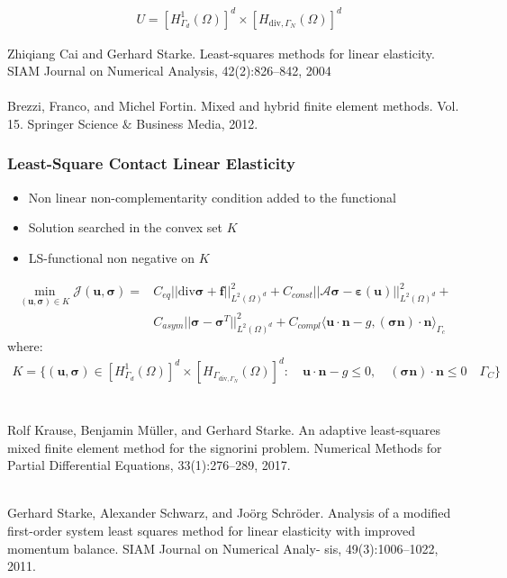 \documentclass[8pt, oneside]{beamer}   	%
\newcommand{\bff}{\textbf{f}}
\newcommand{\bn}{\textbf{n}}
\newcommand{\bu}{\textbf{u}}
\newcommand{\bsigma}{\boldsymbol{\sigma}}
\begin{document}
\begin{frame}
\begin{itemize}
\begin{align*}
& U=\left[H_{\Gamma_{d}}^1(\Omega) \right]^d \times \left[ H_{{\text{div},\Gamma_N}}(\Omega) \right]^d
\end{align*}
\end{itemize}
\footnotesize{Zhiqiang Cai and Gerhard Starke. Least-squares methods for linear elasticity. SIAM Journal on Numerical Analysis, 42(2):826–842, 2004} ${}$\\
${}$\\
\footnotesize{Brezzi, Franco, and Michel Fortin. Mixed and hybrid finite element methods. Vol. 15. Springer Science $\&$ Business Media, 2012.}
\end{frame}



\begin{frame}
\frametitle{\textbf{Least-Square Contact Linear Elasticity}}
\begin{itemize}
\item Non linear non-complementarity condition added to the functional
\item Solution searched in the convex set $K$
\item LS-functional non negative on $K$
\end{itemize}
\begin{align*}
\min \limits_{(\bu,\bsigma) \in  K}\mathcal{J}(\bu,\bsigma)=&C_{eq} ||\text{div} \bsigma+\bff||_{L^2(\Omega)^d}^2+C_{const}||\mathcal{A}\bsigma -\boldsymbol{\varepsilon}(\bu)||_{L^2(\Omega)^d}^2   +\\
&C_{asym}||\bsigma -\bsigma^T||_{L^2(\Omega)^d}^2 +C_{compl} \langle \bu \cdot \bn -g, (\bsigma \bn) \cdot \bn \rangle_{\Gamma_c}
\end{align*}
where:
\begin{align*}
 K=\{  \left(\bu,  \bsigma \right)  \in  \left[H_{\Gamma_{d}}^1(\Omega) \right]^d \times \left[ H_{\Gamma_{\text{div},\Gamma_N}}(\Omega) \right]^d    : \quad 
 \bu \cdot \bn - g  \leq 0, \quad  (\bsigma \bn) \cdot \bn \leq 0 \quad  \Gamma_C
 \}
\end{align*}
${}$\\
${}$\\
\footnotesize{Rolf Krause, Benjamin M\"{u}ller, and Gerhard Starke. An adaptive least-squares mixed finite element method for the signorini problem. Numerical Methods for Partial Differential Equations, 33(1):276–289, 2017.}

${}$\\
\footnotesize{Gerhard Starke, Alexander Schwarz, and Jo\"{o}rg Schr\"{o}der. Analysis of a modified first-order system least squares method for linear elasticity with improved momentum balance. SIAM Journal on Numerical Analy- sis, 49(3):1006–1022, 2011.}
\end{frame}
\end{document}
